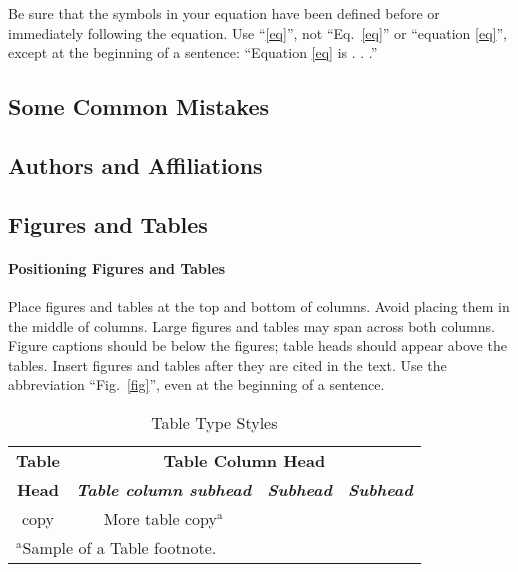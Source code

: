 \documentclass[conference]{IEEEtran}
\begin{document}
Be sure that the 
symbols in your equation have been defined before or immediately following 
the equation. Use ``\eqref{eq}'', not ``Eq.~\eqref{eq}'' or ``equation \eqref{eq}'', except at 
the beginning of a sentence: ``Equation \eqref{eq} is . . .''

\subsection{Some Common Mistakes}\label{SCM}

\subsection{Authors and Affiliations}


\subsection{Figures and Tables}
\paragraph{Positioning Figures and Tables} Place figures and tables at the top and 
bottom of columns. Avoid placing them in the middle of columns. Large 
figures and tables may span across both columns. Figure captions should be 
below the figures; table heads should appear above the tables. Insert 
figures and tables after they are cited in the text. Use the abbreviation 
``Fig.~\ref{fig}'', even at the beginning of a sentence.

\begin{table}[htbp]
\caption{Table Type Styles}
\begin{center}
\begin{tabular}{|c|c|c|c|}
\hline
\textbf{Table}&\multicolumn{3}{|c|}{\textbf{Table Column Head}} \\
\cline{2-4} 
\textbf{Head} & \textbf{\textit{Table column subhead}}& \textbf{\textit{Subhead}}& \textbf{\textit{Subhead}} \\
\hline
copy& More table copy$^{\mathrm{a}}$& &  \\
\hline
\multicolumn{4}{l}{$^{\mathrm{a}}$Sample of a Table footnote.}
\end{tabular}
\label{tab1}
\end{center}
\end{table}




\vspace{12pt}
\end{document}
